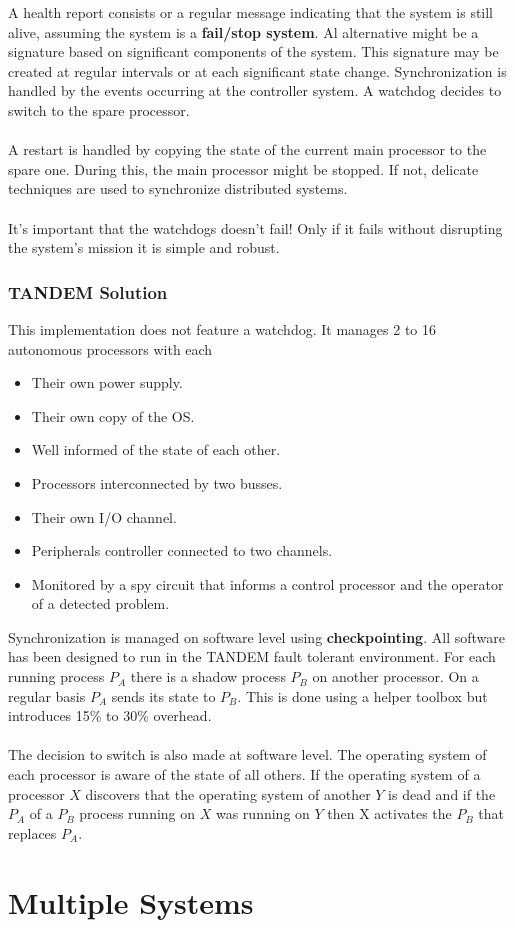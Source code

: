 \documentclass[../main.tex]{subfiles}
\begin{document}
A health report consists or a regular message indicating that the system is still alive, assuming the system is a \textbf{fail/stop system}. Al alternative might be a signature based on significant components of the system. This signature may be created at regular intervals or at each significant state change. Synchronization is handled by the events occurring at the controller system. A watchdog decides to switch to the spare processor. 
\\\\
A restart is handled by copying the state of the current main processor to the spare one. During this, the main processor might be stopped. If not, delicate techniques are used to synchronize distributed systems.
\\\\
It's important that the watchdogs doesn't fail! Only if it fails without disrupting the system's mission it is simple and robust.


\subsubsection{TANDEM Solution}
This implementation does not feature a watchdog. It manages 2 to 16 autonomous processors with each 
\begin{multicols}{2}
\begin{itemize}
	\item Their own power supply.
	\item Their own copy of the OS.
	\item Well informed of the state of each other.
	\item Processors interconnected by two busses.
	\item Their own I/O channel.
	\item Peripherals controller connected to two channels.
	\item Monitored by a spy circuit that informs a control processor and the operator of a detected problem.
\end{itemize}
\end{multicols}

Synchronization is managed on software level using \textbf{checkpointing}. All software has been designed to run in the TANDEM fault tolerant environment. For each running process $P_A$ there is a shadow process $P_B$ on another processor. On a regular basis $P_A$ sends its state to $P_B$. This is done using a helper toolbox but introduces 15\% to 30\% overhead.
\\\\
The decision to switch is also made at software level. The operating system of each processor is aware of the state of all others. If the operating system of a processor $X$ discovers that the operating system of another $Y$ is dead and if the $P_A$ of a $P_B$ process running on $X$ was running on $Y$ then X activates the $P_B$ that replaces $P_A$. 



\section{Multiple Systems}
\end{document}
